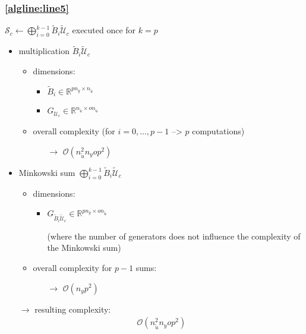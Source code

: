 \documentclass{article}
\begin{document}
\subsubsection{\cref{algline:line5}} 
$\mathcal{S}_c \gets \bigoplus_{i=0}^{k-1}\tilde{B}_i \tilde{\mathcal{U}}_c$ 
executed once for $k=p$
\begin{itemize}
    \item multiplication $\tilde{B}_{i} \tilde{\mathcal{U}}_c$
    \begin{itemize}
        \item dimensions:
        \begin{itemize}
            \item $\tilde{B}_{i} \in \mathbb{R}^{pn_y \times n_{\tilde{u}}}$
            \item $G_{\mathcal{U}_c} \in \mathbb{R}^{n_{\tilde{u}} \times o n_{\tilde{u}}}$
        \end{itemize}
        \item overall complexity (for $i=0,...,p-1$ --> $p$ computations)
        \begin{itemize}
            \item[$\rightarrow$] $\mathcal{O}(n_{\tilde{u}}^2 n_y o p^2)$
        \end{itemize}
    \end{itemize}
    \item Minkowski sum $\bigoplus_{i=0}^{k-1}\tilde{B}_i \tilde{\mathcal{U}}_c$
    \begin{itemize}
        \item dimensions:
        \begin{itemize}            
            \item $G_{\tilde{B}_{i} \tilde{\mathcal{U}}_c} \in \mathbb{R}^{pn_y \times on_{\tilde{u}}}$ 
            \item[] (where the number of generators does not influence the complexity of the Minkowski sum)
        \end{itemize}
        \item overall complexity for $p-1$ sums:%
        \begin{itemize}
            \item[$\rightarrow$] $\mathcal{O}(n_y p^2)$
        \end{itemize}
    \end{itemize}    
    \item[$\rightarrow$] resulting complexity: \begin{align*}
        \mathcal{O}(n_{\tilde{u}}^2 n_y o p^2)
    \end{align*}
\end{itemize}
\end{document}
